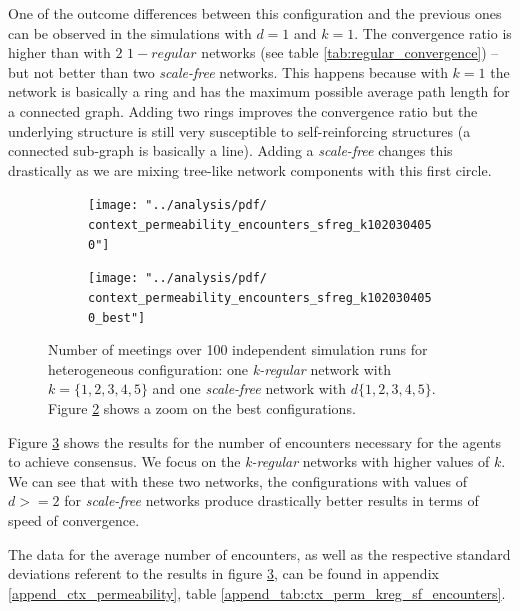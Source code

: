 \documentclass[preprint,number]{elsarticle}
\begin{document}
\noindent One of the outcome differences between this configuration and the previous ones can be observed in the simulations with $d=1$ and $k=1$. The convergence ratio is higher than with $2$ $1-regular$ networks (see table \ref{tab:regular_convergence}) --but not better than two \textit{scale-free} networks. This happens because with $k=1$ the network is basically a ring and has the maximum possible average path length for a connected graph. Adding two rings improves  the convergence ratio but the underlying structure is still very susceptible to self-reinforcing structures (a connected sub-graph is basically a line). Adding a \textit{scale-free} changes this drastically as we are mixing tree-like network components with this first circle.


\begin{figure}[H]
	\centering
	\begin{subfigure}{.49\linewidth}
		\centering
		\texttt{[image: "../analysis/pdf/ context\_permeability\_encounters\_sfreg\_k1020304050"]}
		\caption{}
		\label{fig:ctx_perm_sfkreg_1020304050full}
	\end{subfigure}%
	\begin{subfigure}{.49\linewidth}
		\centering
		\texttt{[image: "../analysis/pdf/  context\_permeability\_encounters\_sfreg\_k1020304050\_best"]}
		\caption{}
		\label{fig:ctx_perm_sfkreg_1020304050best}
	\end{subfigure}
	\begin{minipage}{0.9\linewidth}
		\vspace{0.2cm}
		\caption{Number of meetings over 100 independent simulation runs for heterogeneous configuration: one \textit{k-regular} network with  $k=\{1,2,3,4,5\}$ and one \textit{scale-free} network with $d\{1,2,3,4,5\}$. Figure \ref{fig:ctx_perm_sfkreg_1020304050best} shows a zoom on the best configurations.}
		\label{fig:ctx_perm_sfkreg}
	\end{minipage}
\end{figure}

Figure \ref{fig:ctx_perm_sfkreg} shows the results for the number of encounters necessary for the agents to achieve consensus. We focus on the \textit{k-regular} networks with higher values of $k$. We can see that with these two networks, the configurations with values of $d>=2$ for \textit{scale-free} networks produce drastically better results in terms of speed of convergence.

The data for the average number of encounters, as well as the respective standard deviations referent to the results in figure \ref{fig:ctx_perm_sfkreg}, can be found in appendix \ref{append_ctx_permeability}, table \ref{append_tab:ctx_perm_kreg_sf_encounters}.
\end{document}

